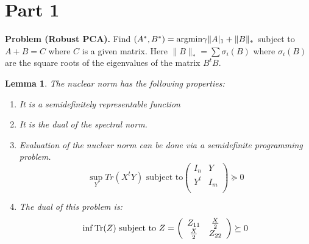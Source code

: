 \documentclass[12pt]{amsart}
\newtheorem{lemma}{Lemma}[section]
\numberwithin{equation}{section}
\begin{document}
\section{Part 1}

{\bf Problem (Robust PCA).} Find $(A^*, B^*)={\rm argmin} \gamma \|A|_1+\|B\|_*$
subject to $A+B=C$ where $C$ is a given matrix. Here $\|B\|_*=\sum \sigma_i(B)$
where $\sigma_i(B)$ are the square roots of the eigenvalues of the matrix $B^tB$.

\begin{lemma} The nuclear norm has the following properties:
\begin{enumerate}
\item It is a semidefinitely representable function
\item It is the dual of the spectral norm. 
\item Evaluation of the nuclear norm can be done via a semidefinite programming problem.
\[\sup_Y Tr(X^tY) \text{ subject to}
\left(
\begin{array}{cc}
I_n & Y\\
Y^t & I_m\\
\end{array}
\right)\succeq 0
\] 


\item The dual of this problem is:
\[
\inf{\rm Tr}(Z) \text{ subject to }Z=\left(
\begin{array}{cc}
Z_{11} & \frac{X}{2}\\
\frac{X}{2} & Z_{22}\\
\end{array}
\right)\succeq 0
\]

\end{enumerate}
\end{lemma}
\end{document}
